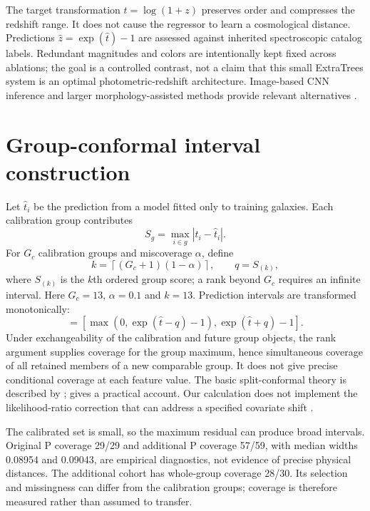 \documentclass[10pt]{article}
\begin{document}
The target transformation $t=\log(1+z)$ preserves order and compresses the
redshift range. It does not cause the regressor to learn a cosmological
distance. Predictions $\hat z=\exp(\hat t)-1$ are assessed against inherited
spectroscopic catalog labels. Redundant magnitudes and colors are intentionally
kept fixed across ablations; the goal is a controlled contrast, not a claim
that this small ExtraTrees system is an optimal photometric-redshift architecture.
Image-based CNN inference and larger morphology-assisted methods provide
relevant alternatives \citep{pasquet2019,soo2018}.

\section{Group-conformal interval construction}
Let $\widehat t_i$ be the prediction from a model fitted only to training
galaxies. Each calibration group contributes
\begin{equation}
 S_g=\max_{i\in g}|t_i-\widehat t_i|.
\end{equation}
For $G_c$ calibration groups and miscoverage $\alpha$, define
\begin{equation}
 k=\left\lceil(G_c+1)(1-\alpha)\right\rceil,
 \qquad q=S_{(k)},
\end{equation}
where $S_{(k)}$ is the $k$th ordered group score; a rank beyond $G_c$ requires
an infinite interval. Here $G_c=13$, $\alpha=0.1$ and $k=13$. Prediction
intervals are transformed monotonically:
\begin{equation}
 [z_-,z_+]=[\max(0,\exp(\widehat t-q)-1),
 \exp(\widehat t+q)-1].
\end{equation}
Under exchangeability of the calibration and future group objects, the rank
argument supplies coverage for the group maximum, hence simultaneous coverage
of all retained members of a new comparable group. It does not give precise
conditional coverage at each feature value. The basic split-conformal theory
is described by \citet{lei2018}; \citet{angelopoulos2021} gives a practical
account. Our calculation does not implement the likelihood-ratio correction
that can address a specified covariate shift \citep{tibshirani2019}.

The calibrated set is small, so the maximum residual can produce broad
intervals. Original P coverage 29/29 and additional P coverage 57/59, with
median widths 0.08954 and 0.09043, are empirical diagnostics, not evidence of
precise physical distances. The additional cohort has whole-group coverage
28/30. Its selection and missingness can differ from the calibration groups;
coverage is therefore measured rather than assumed to transfer.
\end{document}

